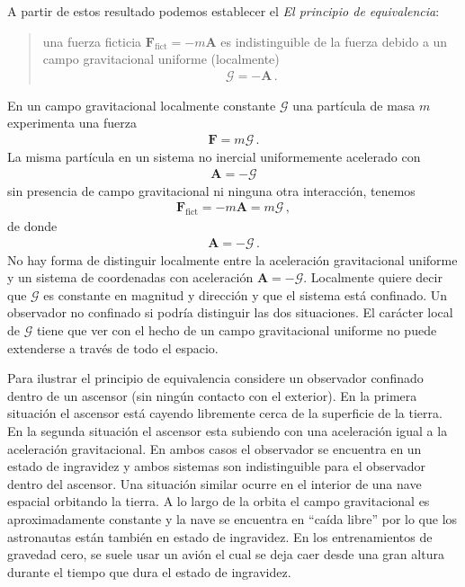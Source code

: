A partir de estos resultado podemos establecer el \emph{El principio de equivalencia}:
\begin{quote}
una fuerza ficticia $\mathbf{F}_{\text{fict}}=-m\mathbf{A}$ es indistinguible de la fuerza debido a un campo gravitacional uniforme (localmente)
\begin{align*}
  \boldsymbol{\mathcal{G}}=-\mathbf{A}\,.
\end{align*}
\end{quote}
En un campo gravitacional localmente constante $\boldsymbol{\mathcal{G}}$ una partícula de masa $m$ experimenta una fuerza
\begin{align*}
  \mathbf{F}=m\boldsymbol{\mathcal{G}}\,.
\end{align*}
La misma partícula en un sistema no inercial uniformemente acelerado con
\begin{align*}
  \mathbf{A}=-\boldsymbol{\mathcal{G}}
\end{align*}
sin presencia de campo gravitacional ni ninguna otra interacción, tenemos
\begin{align*}
   \mathbf{F}_{\text{fict}}=-m\mathbf{A}=m\boldsymbol{\mathcal{G}}\,,
\end{align*}
de donde
\begin{align*}
  \mathbf{A}=-\boldsymbol{\mathcal{G}}\,.
\end{align*}
No hay forma de distinguir localmente entre la aceleración gravitacional uniforme y un sistema de coordenadas con aceleración $\mathbf{A}=-\boldsymbol{\mathcal{G}}$. Localmente quiere decir que $\boldsymbol{\mathcal{G}}$ es constante en magnitud y dirección y que el sistema está confinado. Un observador no confinado si podría distinguir las dos situaciones. El carácter local de $\boldsymbol{\mathcal{G}}$ tiene que ver con el hecho de un campo gravitacional uniforme no puede extenderse a través de todo el espacio. 

Para ilustrar el principio de equivalencia considere un observador confinado dentro de un ascensor (sin ningún contacto con el exterior). En la primera situación el ascensor está cayendo libremente cerca de la superficie de la tierra. En la segunda situación el ascensor esta subiendo con una aceleración igual a la aceleración gravitacional. En ambos casos el observador se encuentra en un estado de ingravidez y ambos sistemas son indistinguible para el observador dentro del ascensor. Una situación similar ocurre en el interior de una nave espacial orbitando la tierra. A lo largo de la orbita el campo gravitacional es aproximadamente constante y la nave se encuentra en ``caída libre'' por lo que los astronautas están también en estado de ingravidez. En los entrenamientos de gravedad cero, se suele usar un avión el cual se deja caer desde una gran altura durante el tiempo que dura el estado de ingravidez. 





